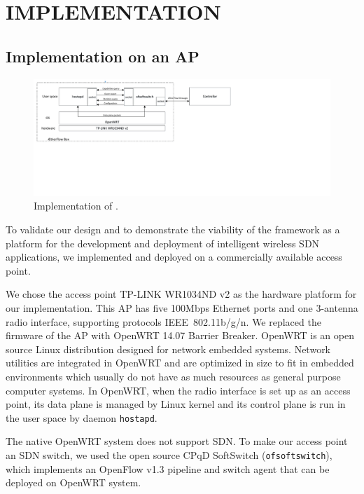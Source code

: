 \chapter{\uppercase {\aetherflowcap Implementation}}
\label{sec:impl}

\section{Implementation on an AP}


\begin{figure}[t]
\centering
\includegraphics[trim=.2in 3.75in 7in .2in, clip, width=1.0\textwidth]{figures/implementation}
\caption{Implementation of \aetherflow.}
\label{fig:impl}
\end{figure}

To validate our design and to demonstrate the viability of the \aetherflow
framework as a platform for the development and deployment of intelligent
wireless SDN applications, we implemented and deployed \aetherflow on a commercially
available access point. 

We chose the access point TP-LINK WR1034ND v2 as the hardware 
platform for our implementation.  This AP has five 100Mbps Ethernet ports and one
3-antenna radio interface, supporting protocols IEEE~802.11b/g/n.  We replaced
the firmware of the AP with OpenWRT 14.07 Barrier Breaker. OpenWRT
is an open source Linux distribution designed for network embedded systems.
Network utilities are integrated in OpenWRT and are optimized in size to fit in
embedded environments which usually do not have as much resources as general
purpose computer systems. In OpenWRT, when the radio interface is set up as an
access point, its data plane is managed by Linux kernel and its control plane
is run in the user space by daemon \texttt{hostapd}. 

The native OpenWRT system does not support SDN. To make our access point an SDN
switch, we used the open source CPqD SoftSwitch (\texttt{ofsoftswitch}), which implements an OpenFlow v1.3 pipeline and switch
agent that can be deployed on OpenWRT system.

